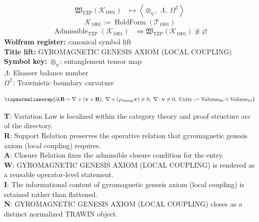 \noindent
\begin{minipage}[t]{0.48\linewidth}
\begingroup
\small
\[
\begin{aligned}
\mathfrak{W}_{\mathrm{TZP}}\!\left(\mathcal{K}_{1001}\right)
&\longmapsto
\left\langle \otimes_{\eta},\; \Lambda,\; \Omega^{\mathbb{T}} \right\rangle
\end{aligned}
\]
\[
\mathcal{K}_{1001}
:=
\operatorname{HoldForm}\!\left(\mathcal{T}_{1001}\right)
\]
\[
\begin{aligned}
\operatorname{Admissible}_{\mathrm{TZP}}\!\left(\mathcal{K}_{1001}\right)
&\Longleftrightarrow
\mathfrak{W}_{\mathrm{TZP}}\!\left(\mathcal{K}_{1001}\right)\not\equiv\varnothing
\end{aligned}
\]
\textbf{Wolfram register:} canonical symbol lift\\
\textbf{Title lift:} GYROMAGNETIC GENESIS AXIOM (LOCAL COUPLING)\\
\textbf{Symbol key:} \(\otimes_{\eta}\): entanglement tensor map\\ \(\Lambda\): Elsasser balance number\\ \(\Omega^{\mathbb{T}}\): Trawinistic boundary curvature
\par
\endgroup
\end{minipage}\hfill
\begin{minipage}[t]{0.48\linewidth}
\[
\tzpnormalizewrap{\partial_t\mathbf{B}=\nabla\times(\mathbf{v}\times\mathbf{B}),\;
\nabla\times(\rho_{\mathrm{charge}}\mathbf{v})\neq0,\;
\nabla\cdot\mathbf{v}\neq0,\;
\mathrm{Unity}:=\mathrm{Volume}_{00}\oplus\mathrm{Volume}_{01}}
\]

\small
\textbf{T}: Variation Law is localized within the category theory and proof structure arc of the directory.\\
\textbf{R}: Support Relation preserves the operative relation that gyromagnetic genesis axiom (local coupling) requires.\\
\textbf{A}: Closure Relation fixes the admissible closure condition for the entry.\\
\textbf{W}: GYROMAGNETIC GENESIS AXIOM (LOCAL COUPLING) is rendered as a reusable operator-level statement.\\
\textbf{I}: The informational content of gyromagnetic genesis axiom (local coupling) is retained rather than flattened.\\
\textbf{N}: GYROMAGNETIC GENESIS AXIOM (LOCAL COUPLING) closes as a distinct normalized TRAWIN object.
\normalsize
\end{minipage}

